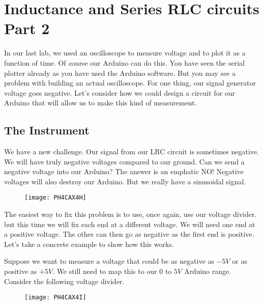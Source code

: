 \chapter{Inductance and Series RLC circuits Part 2}
In our last lab, we used an oscilloscope to measure voltage and to plot it
as a function of time. Of course our Arduino can do this. You have seen the serial plotter already as you have used the Arduino software. But you may see a problem with building an actual oscilloscope. For one thing, our
signal generator voltage goes negative. Let's consider how we could design a circuit for our Arduino that will allow us to make this kind of measurement.

\section{The Instrument}

We have a new challenge. Our signal from our LRC circuit is sometimes negative. We will have truly negative voltages compared to our ground. Can we send a negative voltage into our Arduino? The answer is an emphatic NO! Negative voltages will also destroy our Arduino. But we really have a sinusoidal signal. 
\begin{figure}[h!]
	\centering
	\texttt{[image: PH4CAX4H]}
\end{figure}

The easiest way to fix this problem is to use, once again, use our voltage
divider. but this time we will fix each end at a different voltage. We will need one end at a positive voltage. The other can then go as negative as the first end is positive. Let's take a concrete example to show how this works.

Suppose we want to measure a voltage that could be as negative as $-5\unit{V}$ or as positive as $+5\unit{V}.$ We still need to map this to our $0$ to $5\unit{V}$ Arduino range. Consider the following voltage divider.
\begin{figure}[h!]
	\centering
	\texttt{[image: PH4CAX4I]}
\end{figure}

